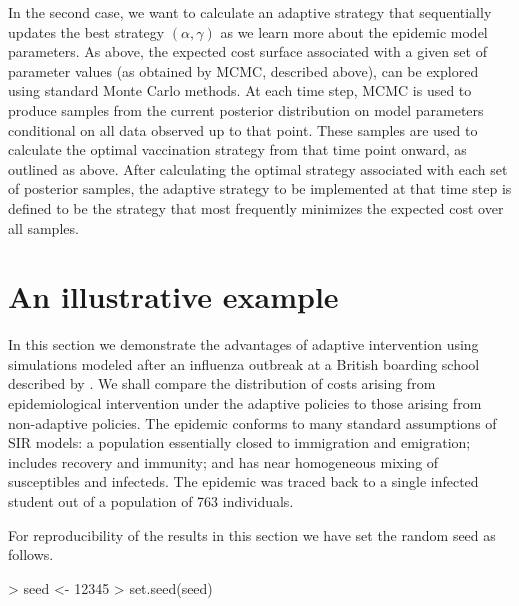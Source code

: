 \documentclass[shortnames,nojss]{jss}
\begin{document}
In the second case, we want to calculate an adaptive strategy that
sequentially updates the best strategy $(\alpha,\gamma)$ as we learn
more about the epidemic model parameters.  As above, the expected cost
surface associated with a given set of parameter values (as obtained
by MCMC, described above), can be explored using standard Monte Carlo
methods.  At each time step, MCMC is used to produce samples from the
current posterior distribution on model parameters conditional on all
data observed up to that point.  These samples are used to calculate
the optimal vaccination strategy from that time point onward, as
outlined as above.  After calculating the optimal strategy associated
with each set of posterior samples, the adaptive strategy to be
implemented at that time step is defined to be the strategy that most
frequently minimizes the expected cost over all samples.

\section{An illustrative example}
\label{sec:pnas}

In this section we demonstrate the advantages of adaptive intervention
using simulations modeled after an influenza outbreak at a British
boarding school described by \citet{murray02}.  We shall compare
the distribution of costs arising from epidemiological intervention
under the adaptive policies to those arising from non-adaptive
policies.  The epidemic conforms to many standard assumptions of SIR
models: a population essentially closed to immigration and emigration;
includes recovery and immunity; and has near homogeneous mixing of
susceptibles and infecteds.  The epidemic was traced back to a single
infected student out of a population of 763 individuals.

For reproducibility of the results in this section we have set
the random seed as follows.
\begin{Schunk}
\begin{Sinput}
> seed <- 12345
> set.seed(seed)
\end{Sinput}
\end{Schunk}
\end{document}
